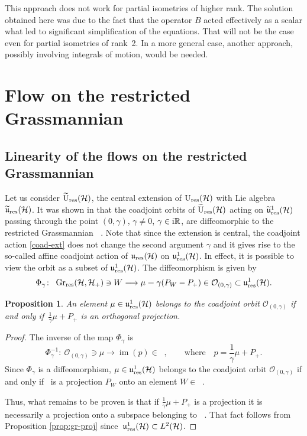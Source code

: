 \documentclass[pdftex]{sigma}
\newtheorem{prop}[thm]{Proposition}
\theoremstyle{definition}
\numberwithin{equation}{section}
\newcommand{\R}{\mathbb R}
\renewcommand{\H}{\mathcal{H}}
\DeclareMathOperator{\Gr}{Gr_{res}(\H,\H_+)}
\newcommand{\Ur}{\mathrm{U}_{\textnormal{res}}(\H)}
\newcommand{\Urt}{\widetilde{\mathrm{U}}_{\textnormal{res}}(\H)}
\newcommand{\ur}{\mathfrak u_{\textnormal{res}}(\H)}
\newcommand{\urp}{\mathfrak u_{\textnormal{res}}^1(\H)}
\newcommand{\urt}{\widetilde{\mathfrak u}_{\textnormal{res}}(\H)}
\newcommand{\urtp}{\widetilde{\mathfrak u}_{\textnormal{res}}^1(\H)}
\DeclareMathOperator{\im}{im}
\newcommand{\Ld}{L^2(\H)}
\newcommand{\tto}{\longrightarrow}
\newcommand{\be}{\begin{equation}}
\newcommand{\ee}{\end{equation}}
\begin{document}
This approach does not work for partial isometries of higher rank. The solution obtained here was due to the fact that the operator $B$ acted effectively as a scalar what led to significant simplification of the equations. That will not be the case even for partial isometries of rank~2. In a more general case, another approach, possibly involving integrals of motion, would be needed.

\section[Flow on the restricted Grassmannian Gr]{Flow on the restricted Grassmannian $\boldsymbol{\Gr}$}\label{sec:gr-lin}

\subsection{Linearity of the flows on the restricted Grassmannian}
Let us consider $\Urt$, the central extension of $\Ur$ with Lie algebra $\urt$.
It was shown in \cite[Theorem 2.13]{Ratiu-grass} that the coadjoint orbits of $\Urt$ acting on $\urtp$ passing through the point $(0,\gamma)$, $\gamma\neq 0$, $\gamma\in {\rm i}\R$, are diffeomorphic to the restricted Grassmannian $\Gr$. Note that since the extension is central, the coadjoint action \eqref{coad-ext} does not change the second argument $\gamma$ and it gives rise to the so-called affine coadjoint action of $\ur$ on $\urp$. In effect, it is possible to view the orbit as a subset of $\urp$. The diffeomorphism is given by
\[
 \Phi_\gamma \colon\ \Gr \ni W \tto \mu = \gamma (P_W - P_+) \in \mathcal O_{(0,\gamma)}\subset \urp. \]
\begin{prop}
An element $\mu\in\urp$ belongs to the coadjoint orbit $\mathcal{O}_{(0,\gamma)}$ if and only if~$\frac{1}{\gamma}\mu + P_+$ is an orthogonal projection.
\end{prop}
\begin{proof}
The inverse of the map $\Phi_\gamma$ is
\be \label{phiGammaInverse}
 \Phi_\gamma^{-1}\colon\ \mathcal{O}_{(0,\gamma)} \ni \mu \tto \im(p) \in \Gr,\qquad\textrm{where}\quad p = \frac{1}{\gamma}\mu + P_+.
 \ee
Since $\Phi_\gamma$ is a diffeomorphism, $\mu\in\urp$ belongs to the coadjoint orbit $\mathcal{O}_{(0,\gamma)}$ if and only if~ is a projection $P_W$ onto an element $W\in \Gr$.

Thus, what remains to be proven is that if $\frac{1}{\gamma}\mu + P_+$ is a projection it is necessarily a projection onto a subspace belonging to $\Gr$. That fact follows from Proposition \ref{prop:gr-proj} since~${\urp\subset \Ld}$.
\end{proof}
\end{document}
